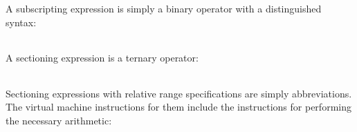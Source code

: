 A subscripting expression is simply a binary operator with a
distinguished syntax:

\begin{center}
\tablelasttail{\hline}
\begin{xtabular}{|m{1.9073598in}|m{2.75596in}|}

\end{xtabular}
\end{center}

A sectioning expression is a ternary operator:

\begin{center}
\tablelasttail{\hline}
\begin{xtabular}{|m{1.9073598in}|m{2.75596in}|}

\end{xtabular}
\end{center}

Sectioning expressions with relative range specifications are simply
abbreviations. The virtual machine instructions for them include the
instructions for performing the necessary arithmetic:

\begin{center}
\tablelasttail{\hline}
\begin{xtabular}{|m{1.9073598in}|m{2.75596in}|}

\end{xtabular}
\end{center}

